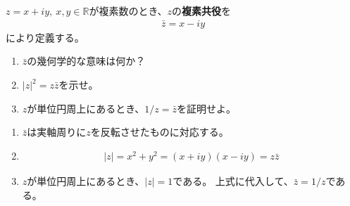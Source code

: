 \begin{renshu}
  $z=x+iy,\ x,y\in\mathbb{R}$が複素数のとき、$z$の\textbf{複素共役}を
\begin{align}
\bar{z}=x-iy
\end{align}
により定義する。
\begin{enumerate}
\item $\bar{z}$の幾何学的な意味は何か？
\item $|z|^{2}=z\bar{z}$を示せ。
\item $z$が単位円周上にあるとき、$1/z=\bar{z}$を証明せよ。
\end{enumerate}
\end{renshu}

\begin{kaitou*}
\begin{enumerate}
\item $\bar{z}$は実軸周りに$z$を反転させたものに対応する。
\item 
\begin{align*}
|z|=x^{2}+y^{2}=(x+iy)(x-iy)=z\bar{z}
\end{align*}
\item $z$が単位円周上にあるとき、$|z|=1$である。
上式に代入して、$\bar{z}=1/z$である。
\end{enumerate}
\end{kaitou*}